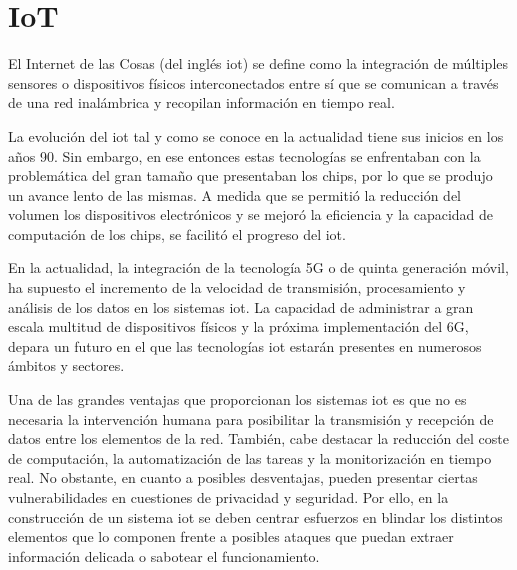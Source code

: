 \section{IoT}
\label{sec:iot}

El Internet de las Cosas (del inglés \gls{iot}) \cite{iot} \cite{iotamazon} se define como la integración de múltiples sensores o dispositivos físicos interconectados entre sí que se comunican a través de una red inalámbrica y recopilan información en tiempo real. 

\vspace{3mm}

La evolución del \gls{iot} tal y como se conoce en la actualidad tiene sus inicios en los años 90. Sin embargo, en ese entonces estas tecnologías se enfrentaban con la problemática del gran tamaño que presentaban los chips, por lo que se produjo un avance lento de las mismas. A medida que se permitió la reducción del volumen los dispositivos electrónicos y se mejoró la eficiencia y la capacidad de computación de los chips, se facilitó el progreso del \gls{iot}.

\vspace{3mm}

En la actualidad, la integración de la tecnología 5G o de quinta generación móvil, ha supuesto el incremento de la velocidad de transmisión, procesamiento y análisis de los datos en los sistemas \gls{iot}. La capacidad de administrar a gran escala multitud de dispositivos físicos y la próxima implementación del 6G, depara un futuro en el que las tecnologías \gls{iot} estarán presentes en numerosos ámbitos y sectores.

\vspace{3mm}

Una de las grandes ventajas que proporcionan los sistemas \gls{iot} es que no es necesaria la intervención humana para posibilitar la transmisión y recepción de datos entre los elementos de la red. También, cabe destacar la reducción del coste de computación, la automatización de las tareas y la monitorización en tiempo real. No obstante, en cuanto a posibles desventajas, pueden presentar ciertas vulnerabilidades en cuestiones de privacidad y seguridad. Por ello, en la construcción de un sistema \gls{iot} se deben centrar esfuerzos en blindar los distintos elementos que lo componen frente a posibles ataques que puedan extraer información delicada o sabotear el funcionamiento. 

\vspace{3mm}


